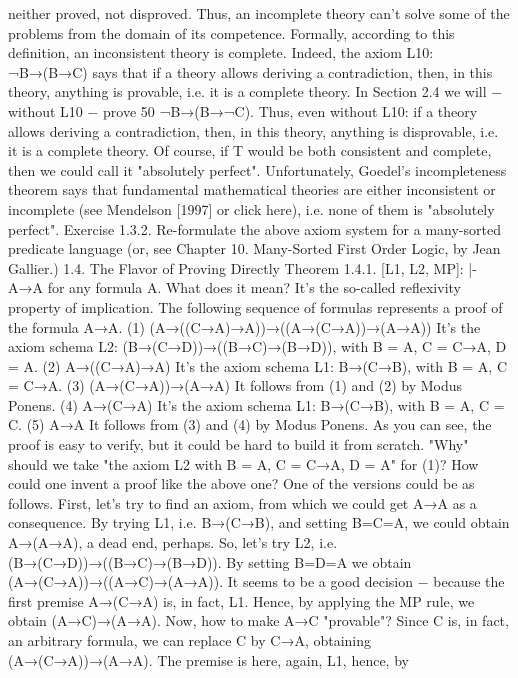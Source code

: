 neither proved, not disproved. Thus, an incomplete theory can't solve some of the problems from the
domain of its competence.
Formally, according to this definition, an inconsistent theory is complete. Indeed, the axiom L10:
¬B→(B→C) says that if a theory allows deriving a contradiction, then, in this theory, anything is
provable, i.e. it is a complete theory. In Section 2.4 we will − without L10 − prove 50%
¬B→(B→¬C). Thus, even without L10: if a theory allows deriving a contradiction, then, in this theory,
anything is disprovable, i.e. it is a complete theory.
Of course, if T would be both consistent and complete, then we could call it "absolutely perfect".
Unfortunately, Goedel's incompleteness theorem says that fundamental mathematical theories are
either inconsistent or incomplete (see Mendelson [1997] or click here), i.e. none of them is "absolutely
perfect".
Exercise 1.3.2. Re-formulate the above axiom system for a many-sorted predicate language (or, see
Chapter 10. Many-Sorted First Order Logic, by Jean Gallier.)
1.4. The Flavor of Proving Directly
Theorem 1.4.1. [L1, L2, MP]: |- A→A for any formula A. What does it mean? It's the so-called
reflexivity property of implication.
The following sequence of formulas represents a proof of the formula A→A.
(1) (A→((C→A)→A))→((A→(C→A))→(A→A)) It's the axiom schema L2:
                                                   (B→(C→D))→((B→C)→(B→D)),
                                                              with B = A, C = C→A, D = A.
(2) A→((C→A)→A) It's the axiom schema L1:
                     B→(C→B), with B = A, C = C→A.
(3) (A→(C→A))→(A→A) It follows from (1) and (2) by Modus
                           Ponens.
(4) A→(C→A) It's the axiom schema L1:
               B→(C→B), with B = A, C = C.
(5) A→A It follows from (3) and (4) by Modus
         Ponens.
As you can see, the proof is easy to verify, but it could be hard to build it from scratch. "Why" should we
take "the axiom L2 with B = A, C = C→A, D = A" for (1)?
How could one invent a proof like the above one? One of the versions could be as follows. First, let's try to find an axiom,
from which we could get A→A as a consequence. By trying L1, i.e. B→(C→B), and setting B=C=A, we could obtain
A→(A→A), a dead end, perhaps. So, let's try L2, i.e. (B→(C→D))→((B→C)→(B→D)). By setting B=D=A we obtain
(A→(C→A))→((A→C)→(A→A)). It seems to be a good decision − because the first premise A→(C→A) is, in fact, L1.
Hence, by applying the MP rule, we obtain (A→C)→(A→A). Now, how to make A→C "provable"? Since C is, in fact, an
arbitrary formula, we can replace C by C→A, obtaining (A→(C→A))→(A→A). The premise is here, again, L1, hence, by
